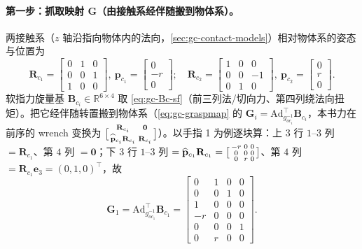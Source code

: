 \paragraph{第一步：抓取映射 $\mathbf{G}$（由接触系经伴随搬到物体系）。}
两接触系（$z$ 轴沿指向物体内的法向，\cref{sec:gc-contact-models}）相对物体系的姿态与位置为\cite{murray1994mathematical}
\begin{equation}
\mathbf{R}_{c_1}=\begin{bmatrix}0&1&0\\0&0&1\\1&0&0\end{bmatrix},\ \mathbf{p}_{c_1}=\begin{bmatrix}0\\-r\\0\end{bmatrix};\quad
\mathbf{R}_{c_2}=\begin{bmatrix}1&0&0\\0&0&-1\\0&1&0\end{bmatrix},\ \mathbf{p}_{c_2}=\begin{bmatrix}0\\r\\0\end{bmatrix}.
\label{eq:gc-scara-frames}
\end{equation}
软指力旋量基 $\mathbf{B}_{c_i}\in\mathbb{R}^{6\times4}$ 取 \cref{eq:gc-Bc-sf}（前三列法/切向力、第四列绕法向扭矩）。把它经伴随转置搬到物体系（\cref{eq:gc-graspmap} 的 $\mathbf{G}_i=\mathrm{Ad}_{g_{oc_i}^{-1}}^\top\mathbf{B}_{c_i}$，本书力在前序的 wrench 变换为 $\big[\begin{smallmatrix}\mathbf{R}_{c_i}&\mathbf{0}\\ \widehat{\mathbf{p}}_{c_i}\mathbf{R}_{c_i}&\mathbf{R}_{c_i}\end{smallmatrix}\big]$）。以手指 1 为例逐块算：上 $3$ 行 $1$--$3$ 列 $=\mathbf{R}_{c_1}$、第 $4$ 列 $=\mathbf{0}$；下 $3$ 行 $1$--$3$ 列 $=\widehat{\mathbf{p}}_{c_1}\mathbf{R}_{c_1}=\big[\begin{smallmatrix}-r&0&0\\0&0&0\\0&r&0\end{smallmatrix}\big]$、第 $4$ 列 $=\mathbf{R}_{c_1}\mathbf{e}_3=(0,1,0)^\top$，故
\begin{equation}
\mathbf{G}_1=\mathrm{Ad}_{g_{oc_1}^{-1}}^\top\mathbf{B}_{c_1}=
\begin{bmatrix}0&1&0&0\\0&0&1&0\\1&0&0&0\\-r&0&0&0\\0&0&0&1\\0&r&0&0\end{bmatrix}.
\label{eq:gc-scara-G1}
\end{equation}
